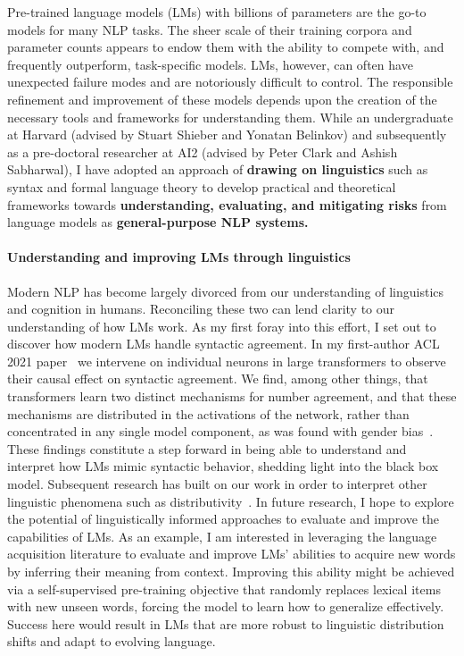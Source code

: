 \documentclass[11pt]{article}
\begin{document}
Pre-trained language models (LMs) with billions of parameters 
are the go-to models for many NLP tasks.
The sheer scale of their training corpora and parameter counts
appears to endow them with the ability to compete with, 
and frequently outperform, task-specific models.
LMs, however, can often have unexpected failure modes 
and are notoriously difficult to control.
The responsible refinement and improvement of these models
depends upon the creation of the necessary tools 
and frameworks for understanding them.
While an undergraduate at Harvard (advised by Stuart Shieber and Yonatan Belinkov) and subsequently as a pre-doctoral researcher 
at AI2 (advised by Peter Clark and Ashish Sabharwal), 
I have adopted an approach of 
\textbf{drawing on linguistics} such as syntax and formal language theory 
to develop practical and theoretical frameworks  
towards \textbf{understanding, evaluating, and mitigating risks} from language models 
as \textbf{general-purpose NLP systems.}

\paragraph{Understanding and improving LMs through linguistics}

Modern NLP has become largely divorced 
from our understanding of linguistics and cognition in humans.
Reconciling these two can lend clarity to our understanding of how LMs work.
As my first foray into this effort, I set out to 
discover how modern LMs handle syntactic agreement.
In my first-author ACL 2021 paper~\cite{finlayson-etal-2021-causal}
we intervene on individual neurons in large transformers 
to observe their causal effect on syntactic agreement.
We find, among other things, that transformers learn 
two distinct mechanisms for number agreement,
and that these mechanisms are distributed in the activations of the network, 
rather than concentrated in any single model component,
as was found with gender bias~\cite{Vig2020InvestigatingGB}.
These findings constitute a step forward in being able to understand and interpret
how LMs mimic syntactic behavior, shedding light into the black box model.
Subsequent research has built on our work 
in order to interpret other linguistic phenomena 
such as distributivity~\cite{Ban2022TestingPL}.
In future research, I hope to explore 
the potential of linguistically informed approaches
to evaluate and improve the capabilities of LMs. 
As an example, I am interested in leveraging the language acquisition literature
to evaluate and improve LMs' abilities 
to acquire new words by inferring their meaning from context.
Improving this ability might be achieved via a self-supervised pre-training objective 
that randomly replaces lexical items with new unseen words, 
forcing the model to learn how to generalize effectively.
Success here would result in LMs that are 
more robust to linguistic distribution shifts
and adapt to evolving language.
\end{document}
